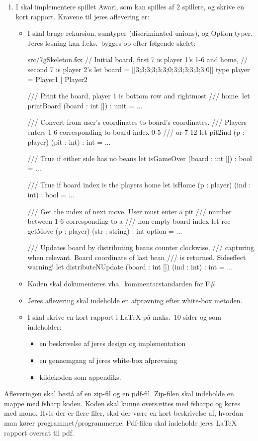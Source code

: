 \documentclass[a4paper,12pt]{article}
\begin{document}
\begin{enumerate}[label=7g.\arabic*,start=0]
\item I skal implementere spillet Awari, som kan spilles af 2
  spillere, og skrive en kort rapport. Kravene til jeres aflevering
  er:
  \begin{itemize}
  \item I skal bruge rekursion, sumtyper (discriminated unions), og
    Option typer. Jeres løsning kan f.eks.\ bygges op efter følgende skelet:
     \begin{verbatimwrite}{src/7gSkeleton.fsx}
// Initial board, first 7 is player 1's 1-6 and home,
// second 7 is player 2's
let board = [|3;3;3;3;3;3;0;3;3;3;3;3;3;0|]
type player = Player1 | Player2

/// Print the board, player 1 is bottom row and rightmost
/// home.
let printBoard (board : int []) : unit =
  ...

/// Convert from user's coordinates to board's coordinates.
/// Players enters 1-6 corresponding to board index 0-5
/// or 7-12
let pit2ind (p : player) (pit : int) : int =
  ...

/// True if either side has no beans
let isGameOver (board : int []) : bool =
  ...

/// True if board index is the players home
let isHome (p : player) (ind : int) : bool =
  ...

/// Get the index of next move. User must enter a pit
/// number between 1-6 corresponding to a
/// non-empty board index
let rec getMove (p : player) (str : string) : int option =
  ...

/// Updates board by distributing beans counter clockwise,
/// capturing when relevant. Board coordinate of last bean
/// is returned. Sideeffect warning!
let distributeNUpdate (board : int []) (ind : int) : int =
  ...
     \end{verbatimwrite}
    \item Koden skal dokumenteres vha.\ kommentarstandarden for F\#
    \item Jeres aflevering skal indeholde en afprøvning efter white-box metoden.
    \item I skal skrive en kort rapport i LaTeX  på maks.\ 10 sider og
      som indeholder:
      \begin{itemize}
      \item en beskrivelse af jeres design og implementation
      \item en gennemgang af jeres white-box afprøvning
      \item kildekoden som appendiks.
      \end{itemize}
  \end{itemize}
\end{enumerate}

Afleveringen skal bestå af en zip-fil og en pdf-fil. Zip-filen skal
indeholde en mappe med fsharp koden. Koden skal kunne oversættes med
fsharpc og køres med mono. Hvis der er flere filer, skal der være en
kort beskrivelse af, hvordan man kører
programmet/programmerne. Pdf-filen skal indeholde jeres LaTeX rapport
oversat til pdf.
\end{document}

